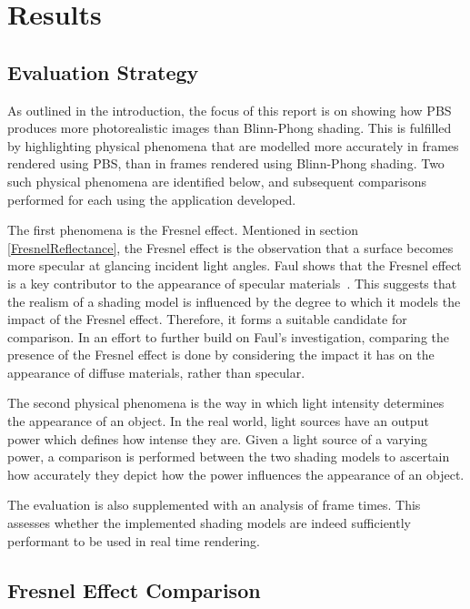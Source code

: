 \chapter{Results}
\label{chapter3}

\section{Evaluation Strategy}

As outlined in the introduction, the focus of this report is on showing how PBS produces more photorealistic images than Blinn-Phong shading. This is fulfilled by highlighting physical phenomena that are modelled more accurately in frames rendered using PBS, than in frames rendered using Blinn-Phong shading. Two such physical phenomena are identified below, and subsequent comparisons performed for each using the application developed.

The first phenomena is the Fresnel effect. Mentioned in section \ref{FresnelReflectance}, the Fresnel effect is the observation that a surface becomes more specular at glancing incident light angles. Faul shows that the Fresnel effect is a key contributor to the appearance of specular materials~\cite{FaulInfluenceOfFresnelEffect}. This suggests that the realism of a shading model is influenced by the degree to which it models the impact of the Fresnel effect. Therefore, it forms a suitable candidate for comparison. In an effort to further build on Faul's investigation, comparing the presence of the Fresnel effect is done by considering the impact it has on the appearance of diffuse materials, rather than specular.

The second physical phenomena is the way in which light intensity determines the appearance of an object. In the real world, light sources have an output power which defines how intense they are. Given a light source of a varying power, a comparison is performed between the two shading models to ascertain how accurately they depict how the power influences the appearance of an object.

The evaluation is also supplemented with an analysis of frame times. This assesses whether the implemented shading models are indeed sufficiently performant to be used in real time rendering.

\section{Fresnel Effect Comparison}

